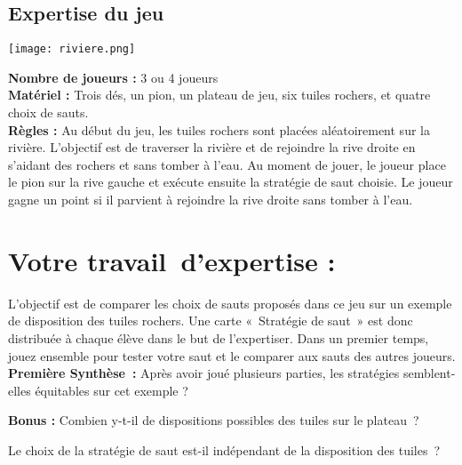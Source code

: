 \documentclass[a4paper,11pt,exos]{nsi} %
\begin{document}
\subsection*{Expertise du jeu}
\begin{center}
    \texttt{[image: riviere.png]}
\end{center}

\textbf{Nombre de joueurs :}  3 ou 4 joueurs\\[.5em]
\textbf{Matériel :} Trois dés, un pion, un plateau de jeu, six tuiles rochers, et quatre choix de sauts.\\[.5em]
\textbf{Règles :} Au début du jeu, les tuiles rochers sont placées aléatoirement sur la rivière. L’objectif est de traverser la rivière et de rejoindre la rive droite en s’aidant des rochers et sans tomber à l’eau. Au moment de jouer, le joueur place le pion sur la rive gauche et exécute ensuite la stratégie de saut choisie. Le joueur gagne un point si il parvient à rejoindre la rive droite sans tomber à l’eau.\\

\section*{Votre travail d’expertise :}
L’objectif est de comparer les choix de sauts proposés dans ce jeu sur un exemple de disposition des tuiles rochers. Une carte « Stratégie de saut » est donc distribuée à chaque élève dans le but de l’expertiser.
Dans un premier temps, jouez ensemble pour tester votre saut et le comparer aux sauts des autres joueurs.\\

\textbf{Première Synthèse :} Après avoir joué plusieurs parties, les stratégies semblent-elles équitables sur cet exemple ?\\[.5em]

\textbf{Bonus :} Combien y-t-il de dispositions possibles des tuiles sur le plateau ? \\[.5em]

Le choix de la stratégie de saut est-il indépendant de la disposition des tuiles ? \\[.5em]

\newpage
\end{document}
